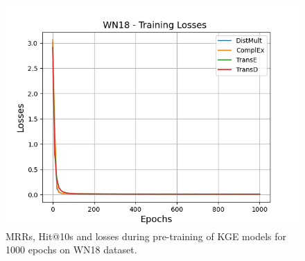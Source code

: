 \begin{figure}
\begin{minipage}{.3\textwidth}
      \includegraphics[width=\linewidth]{figures/results/pretrain/wn18/pretrain_wn18_losses.png}
    \end{minipage}%
    \caption{MRRs, Hit@10s and losses during pre-training of \ac{KGE} models for 1000 epochs on \textsc{WN18} dataset.}
    \label{fig:pretraining}
\end{figure}
